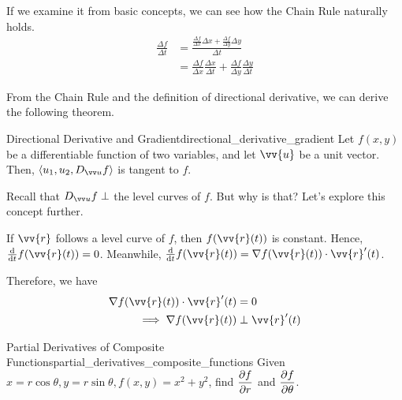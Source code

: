 If we examine it from basic concepts, we can see how the Chain Rule naturally holds.
\begin{align*}
    \frac{\Delta f}{\Delta t} &= \frac{\frac{\Delta f}{\Delta x} \Delta x + \frac{\Delta f}{\Delta y} \Delta y}{\Delta t} \\[0.5em]
    &= \frac{\Delta f}{\Delta x} \frac{\Delta x}{\Delta t} + \frac{\Delta f}{\Delta y} \frac{\Delta y}{\Delta t}
\end{align*}

From the Chain Rule and the definition of directional derivative, we can derive the following theorem.

\begin{theorem}{Directional Derivative and Gradient}{directional_derivative_gradient}
Let $f(x, y)$ be a differentiable function of two variables, and let $\vv{u}$ be a unit vector. Then, $\ang{u_1, u_2, \direcd{u}{f}}$ is tangent to $f$.
\end{theorem}

Recall that $\direcd{u}{f} \perp$ the level curves of $f$. But why is that? Let's explore this concept further.

If $\vv{r}$ follows a level curve of $f$, then $f(\vv{r}(t))$ is constant. Hence, $\ddt f(\vv{r}(t)) = 0$.
Meanwhile, $\ddt f(\vv{r}(t)) = \nabla f(\vv{r}(t)) \cdot \vv{r}'(t)$.

Therefore, we have
\begin{align*}
    \nabla f(\vv{r}(t)) \cdot \vv{r}'(t) &= 0 \\
    \implies \nabla f(\vv{r}(t)) &\perp \vv{r}'(t)
\end{align*}


\begin{problem}{Partial Derivatives of Composite Functions}{partial_derivatives_composite_functions}
Given $x = r \cos \theta, y = r \sin \theta, f(x, y) = x^2 + y^2$, find $\displaystyle\pdv{f}{r}$ and $\displaystyle\pdv{f}{\theta}$.
\end{problem}

